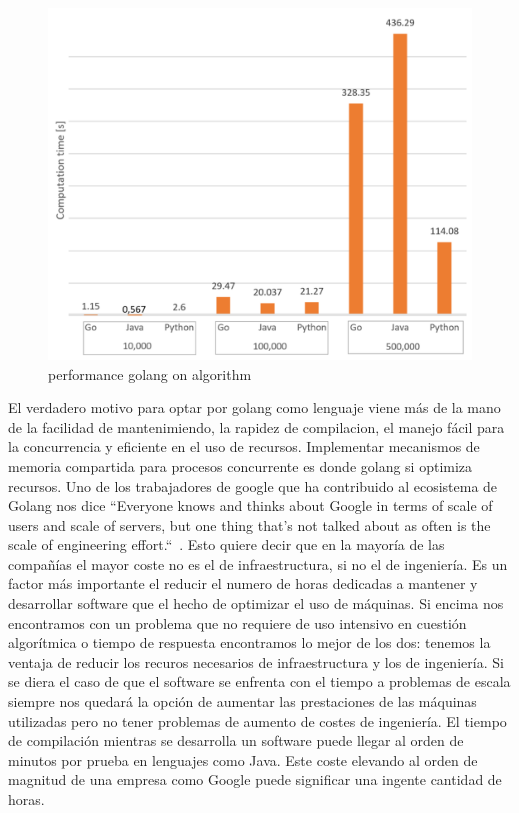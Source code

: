 \begin{figure}[H]
	\includegraphics[height=0.3\textheight]{./part/Proyecto_ejecutivo/memoria_constructiva/golang/img/compTime}
	\caption[performance golang on algorithm]{performance golang on algorithm\cite{Dymora20201}}\label{fig:performance golang}
\end{figure}

El verdadero motivo para optar por golang como lenguaje viene más de la mano de la facilidad de mantenimiendo, la rapidez de compilacion, el manejo fácil para la concurrencia y eficiente en el uso de recursos. Implementar mecanismos de memoria compartida para procesos concurrente es donde golang si optimiza recursos. Uno de los trabajadores de google que ha contribuido al ecosistema de Golang nos dice “Everyone knows and thinks about Google in terms of scale of users and scale of servers, but one thing that's not talked about as often is the scale of engineering effort.“~\cite{Meyerson2014104+101}. Esto quiere decir que en la mayoría de las compañías el mayor coste no es el de infraestructura, si no el de ingeniería. Es un factor más importante el reducir el numero de horas dedicadas a mantener y desarrollar software que el hecho de optimizar el uso de máquinas. Si encima nos encontramos con un problema que no requiere de uso intensivo en cuestión algorítmica o tiempo de respuesta encontramos lo mejor de los dos: tenemos la ventaja de reducir los recuros necesarios de infraestructura y los de ingeniería. Si se diera el caso de que el software se enfrenta con el tiempo a problemas de escala siempre nos quedará la opción de aumentar las prestaciones de las máquinas utilizadas pero no tener problemas de aumento de costes de ingeniería. El tiempo de compilación mientras se desarrolla un software puede llegar al orden de minutos por prueba en lenguajes como Java. Este coste elevando al orden de magnitud de una empresa como Google puede significar una ingente cantidad de horas.

